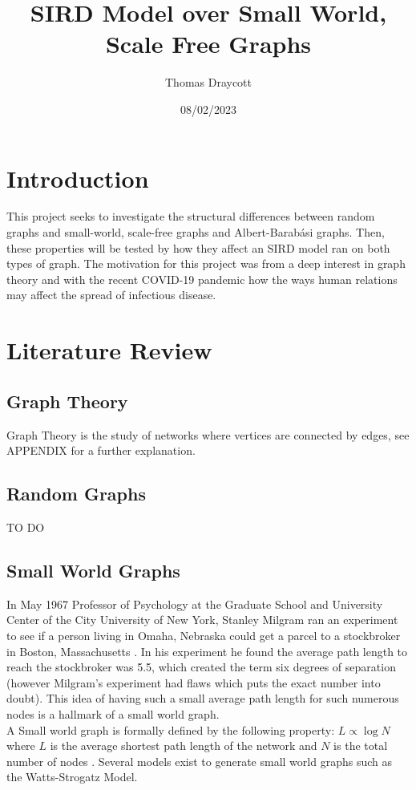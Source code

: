 \documentclass{article}
\title{SIRD Model over Small World, Scale Free Graphs}
\date{08/02/2023}
\author{Thomas Draycott}
\begin{document}
    \maketitle
    \newpage
    \tableofcontents
    \newpage
    \section{Introduction}
    This project seeks to investigate the structural differences between random graphs and small-world, scale-free graphs and Albert-Barabási graphs. Then, these properties will be tested by how they affect an SIRD model ran on both types of graph. The motivation for this project was from a deep interest in graph theory and with the recent COVID-19 pandemic how the ways human relations may affect the spread of infectious disease.
    


    \section{Literature Review}
        \subsection{Graph Theory}
        Graph Theory is the study of networks where vertices are connected by edges, see APPENDIX for a further explanation.
        \subsection{Random Graphs}
        TO DO
        \subsection{Small World Graphs}
        In May 1967 Professor of Psychology at the Graduate School and University Center of the City University of New York, Stanley Milgram ran an experiment to see if a person living
        in Omaha, Nebraska could get a parcel to a stockbroker in Boston, Massachusetts \parencite{milgram1967small}. In his experiment he found the average path length to reach the stockbroker was 5.5, which created the term
        six degrees of separation (however Milgram's experiment had flaws which puts the exact number into doubt). This idea of having such a small average path length for such numerous nodes is a hallmark of a small world graph.\\
        A Small world graph is formally defined by the following property: $L\propto\log{N}$ where $L$ is the average shortest path length of the network and $N$ is the total number of nodes \parencite{Watts1998}. Several models exist to generate small world graphs such as the Watts-Strogatz Model.
\end{document}
